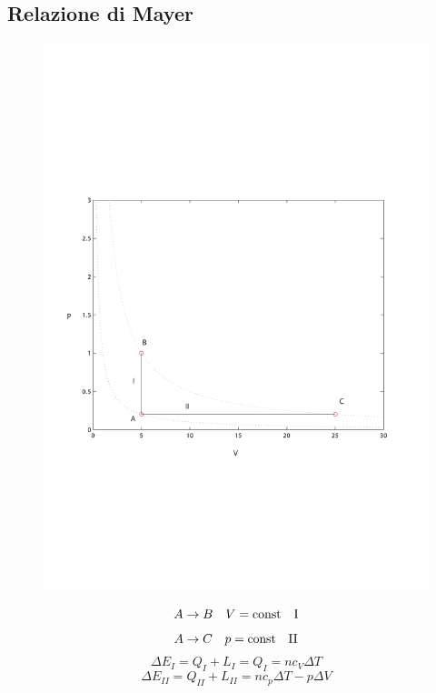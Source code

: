 \subsection{Relazione di Mayer}
\label{mayer}
\begin{figure}[!htbp]
\centering
\includegraphics[scale=0.5]{immagini/fisica1/pV2_win}
\end{figure}
\begin{equation*}A\rightarrow B\quad V=\text{const}\quad \text{I}\end{equation*}
\begin{equation*}A\rightarrow C\quad p=\text{const}\quad \text{II}\end{equation*}
\begin{equation*}\Delta E_I=Q_I+L_I=Q_I=nc_V\Delta T\end{equation*}
\begin{equation*}\Delta E_{II}=Q_{II}+L_{II}=nc_p\Delta T-p\Delta V\end{equation*}
